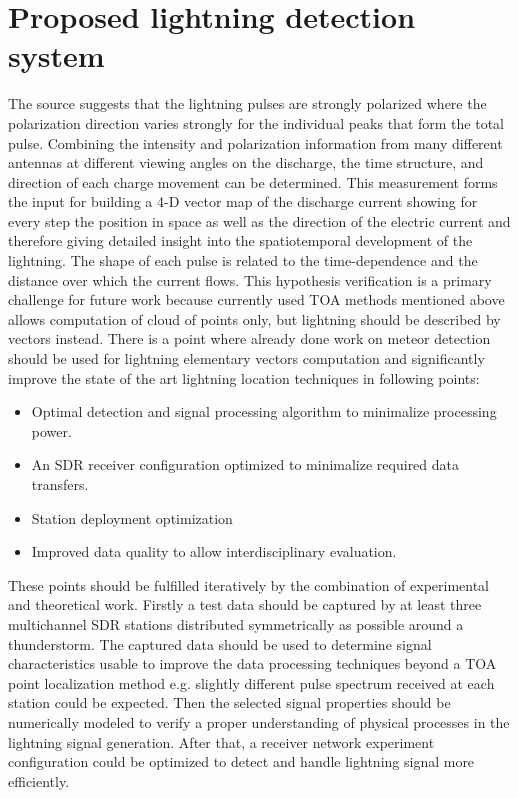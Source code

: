 \documentclass[twoside]{ctuthesis}
\theoremstyle{plain}
\theoremstyle{definition}
\theoremstyle{note}
\begin{document}
\section{Proposed lightning detection system}
The source \cite{LOFAR_lightning} suggests that the lightning pulses are strongly polarized where the polarization direction varies strongly for the individual peaks that form the total pulse. Combining the intensity and polarization information from many different antennas at different viewing angles on the discharge, the time structure, and direction of each charge movement can be determined.  This measurement forms the input for building a 4-D vector map of the discharge current showing for every step the position in space as well as the direction of the electric current and therefore giving detailed insight into the spatiotemporal development of the lightning.  The shape of each pulse is related to the time-dependence and the distance over which the current flows.
This hypothesis verification is a primary challenge for future work because currently used TOA methods mentioned above allows computation of cloud of points only, but lightning should be described by vectors instead. There is a point where already done work on meteor detection should be used for lightning elementary vectors computation and significantly improve the state of the art lightning location techniques in following points: 

\begin{itemize}
\item Optimal detection and signal processing algorithm to minimalize processing power.
\item An  SDR receiver configuration optimized to minimalize required data transfers.
\item Station deployment optimization
\item Improved data quality to allow interdisciplinary evaluation.
\end{itemize}

These points should be fulfilled iteratively by the combination of experimental and theoretical work.  Firstly a test data should be captured by at least three multichannel SDR stations distributed symmetrically as possible around a thunderstorm. The captured data should be used to determine signal characteristics usable to improve the data processing techniques beyond a TOA point localization method e.g. slightly different pulse spectrum received at each station could be expected. 
Then the selected signal properties should be numerically modeled to verify a proper understanding of physical processes in the lightning signal generation. After that, a receiver network experiment configuration could be optimized to detect and handle lightning signal more efficiently. 
\end{document}
